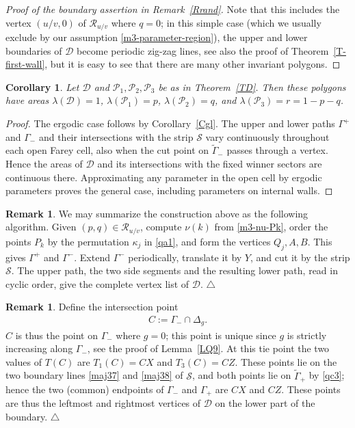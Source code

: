 \documentclass[11pt,reqno,tbtags,a4paper]{amsart}
\numberwithin{equation}{section}
\theoremstyle{plain}%
\newtheorem{corollary}[theorem]{Corollary}
\theoremstyle{definition}
\newcommand\xqed[1]{%
    \leavevmode\unskip\penalty9999 \hbox{}\nobreak\hfill
    \quad\hbox{#1}}
\newtheorem{remarkqqq}[theorem]{Remark}
\newenvironment{remark}{\begin{remarkqqq}}
  {\xqed{$\triangle$}\end{remarkqqq}}
\theoremstyle{remark}
\newcommand{\refT}[1]{Theorem~\ref{#1}}
\newcommand{\refC}[1]{Corollary~\ref{#1}}
\newcommand{\refL}[1]{Lemma~\ref{#1}}
\newcommand{\refR}[1]{Remark~\ref{#1}}
\newcommand\gD{\Delta}
\newcommand\gG{\Gamma}
\newcommand\gl{\lambda}
\newcommand\cD{\mathcal D}
\newcommand\cP{\mathcal P}
\newcommand\cR{{\mathcal R}}
\newcommand\cS{{\mathcal S}}
\newcommand\tgG{\widetilde{\gG}}
\newcommand\0{{\boldsymbol 0}}
\newcommand\1{{\boldsymbol 1}}
\begin{document}
\begin{proof}[Proof of the boundary assertion in \refR{Rrand}]
Note that this includes the vertex $(u/v,0)$ of $\cR_{u/v}$ where $q=0$; 
in this simple case 
(which we usually exclude by our assumption \eqref{m3-parameter-region}),
the upper and lower boundaries of $\cD$ become periodic zig-zag lines, see
also the proof of \refT{T-first-wall},
but
it is easy to see that there are many other invariant polygons.
\end{proof}

\begin{corollary}\label{Careas}
  Let $\cD$ and $\cP_1,\cP_2,\cP_3$ be as in \refT{TD}.
Then these polygons have areas $\gl(\cD)=1$, $\gl(\cP_1)=p$, $\gl(\cP_2)=q$,
and $\gl(\cP_3)=r=1-p-q$.
\end{corollary}
\begin{proof}
  The ergodic case follows by \refC{Cgl}. The upper and lower paths 
$\gG^+$ and $\gG_-$
and their intersections with the strip $\cS$ 
vary continuously throughout each open Farey
cell, also when the cut point on $\tgG_-$  
passes through a vertex. Hence the areas of $\cD$
and its intersections with the fixed winner sectors are continuous there.
Approximating any parameter in the open cell by ergodic parameters proves
the general case, including parameters on internal walls.
\end{proof}

\begin{remark}\label{Rcon}
 We may summarize the construction above as the following  algorithm.  
Given
$(p,q)\in\cR_{u/v}$, compute $\nu(k)$ from \eqref{m3-nu-Pk}, order the points
$P_k$ by the permutation $\kappa_j$ in \eqref{qa1}, and form the vertices
$Q_j,A,B$.  This gives $\gG^+$ and $\gG^-$.  Extend $\gG^-$ periodically,
translate it by $Y$, and cut it by the strip $\cS$.  The upper path, the two
side segments and the resulting lower path, read in cyclic order, give the
complete vertex list of $\cD$.
\end{remark}

\begin{remark}\label{RC}
Define the intersection point %
\begin{align}
  \label{m3-C}
C:=\gG_-\cap\gD_g.
\end{align}
$C$ is thus the point on $\gG_-$ where $g=0$; this point
is unique since $g$ is strictly increasing along $\gG_-$,
see the proof of \refL{LQ9}. %
At this tie point the two values of $T(C)$ are $T_1(C)=CX$ and $T_3(C)=CZ$.
These points lie
on the two boundary lines \eqref{maj37} and \eqref{maj38} of $\cS$,
and both points lie on $\tgG_+$ by \eqref{qc3};
hence the two (common) endpoints of $\gG_-$ and $\gG_+$ are $CX$ and $CZ$.
These points are thus the leftmost and rightmost vertices of $\cD$
on the lower part of the boundary.
\end{remark}
\end{document}

